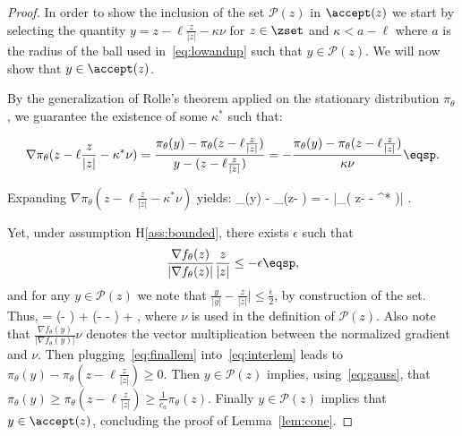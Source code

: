 \documentclass{article} %
\begin{document}
\begin{proof}

In order to show the inclusion of the set $\mathcal{P}(z)$ in $\accept(z)$ we start by selecting the quantity $y = z- \ell \frac{z}{|z|} - \kappa \nu$ for $z\in \zset$ and $\kappa < a - \ell $ where $a$ is the radius of the ball used in~\eqref{eq:lowandup} such that $y \in \mathcal{P}(z)$.
We will now show that $y \in \accept(z)$.

By the generalization of Rolle's theorem applied on the stationary distribution $\pi_\theta$, we guarantee the existence of some $\kappa^*$ such that:

\begin{align}
\nabla \pi_\theta( z- \ell \frac{z}{|z|} - \kappa^* \nu)  = \frac{\pi_\theta(y) - \pi_\theta(z- \ell \frac{z}{|z|})}{y - (z- \ell \frac{z}{|z|})} = - \frac{\pi_\theta(y) - \pi_\theta(z- \ell \frac{z}{|z|})}{\kappa \nu} \eqsp.
\end{align}

Expanding $\nabla \pi_\theta( z- \ell \frac{z}{|z|} - \kappa^* \nu)$ yields:
\beq\label{eq:interlem}
\pi_\theta(y) - \pi_\theta(z- \ell {}) = - \kappa \nu {} |\nabla \pi_\theta( z- \ell {} - \kappa^* \nu)| \eqsp.
\eeq

Yet, under assumption H\ref{ass:bounded}, there exists $\epsilon$ such that 
$$
 \frac{\nabla f_{\theta}(z) }{|\nabla f_{\theta}(z) |}  \frac{z }{|z|} \leq -\epsilon \eqsp,
 $$
 and for any $y \in \mathcal{P}(z)$ we note that $\frac{y }{|y|} - \frac{z }{|z|}|\leq \frac{\epsilon}{2}$, by construction of the set.
 Thus, 
\beq\label{eq:finallem}
    \nu  =   (\nu - ) +   (\nu -  -  ) +     \eqsp,
\eeq
 where $\nu$ is used in the definition of $\mathcal{P}(z)$.
 Also note that $  \frac{\nabla f_{\theta}(y) }{|\nabla f_{\theta}(y) |}  \nu  $ denotes the vector multiplication between the normalized gradient and $\nu$.
Then plugging~\eqref{eq:finallem} into~\eqref{eq:interlem} leads to $\pi_\theta(y) - \pi_\theta(z- \ell \frac{z}{|z|}) \geq 0$.
Then $y \in \mathcal{P}(z)$ implies, using~\eqref{eq:gauss}, that $\pi_\theta(y) \geq \pi_\theta(z- \ell \frac{z}{|z|}) \geq \frac{1}{c_a} \pi_\theta(z)$. 
 Finally $y \in \mathcal{P}(z)$ implies that $y \in \accept(z)$, concluding the proof of Lemma~\ref{lem:cone}.
 
\end{proof}
\end{document}
